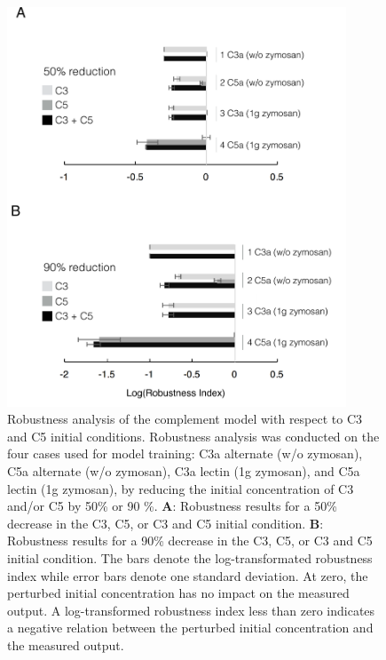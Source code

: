 \documentclass[12pt]{article}
\begin{document}
\begin{figure}[h]
\centering
\includegraphics[width=0.9\textwidth]{./figs/Figure5_RobustnessAnalysis_v2.pdf}
\caption{Robustness analysis of the complement model with respect to C3 and C5 initial conditions.
Robustness analysis was conducted on the four cases used for model training:
C3a alternate (w/o zymosan), C5a alternate (w/o zymosan),  C3a lectin (1g zymosan), and C5a lectin (1g zymosan), by reducing the initial concentration of C3 and/or C5
by 50\% or 90 \%.
\textbf{A}: Robustness results for a 50\% decrease in the C3, C5, or C3 and C5 initial condition.
\textbf{B}: Robustness results for a 90\% decrease in the C3, C5, or C3 and C5 initial condition.
The bars denote the log-transformated robustness index while error bars denote one standard deviation. At zero, the perturbed initial concentration has no impact on the measured output.
A log-transformed robustness index less than zero indicates a negative relation between the perturbed initial concentration and the measured output.}\label{fig-robustness-analysis}
\end{figure}


\end{document}
